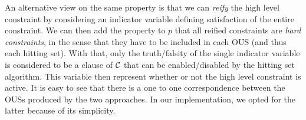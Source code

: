 {An alternative view on the same property is that we can \emph{reify} the high level constraint by considering an indicator variable defining satisfaction of the entire constraint. 
We can then add the property to $p$ that all reified constraints are \emph{hard constraints}, in the sense that they have to be included in each OUS (and thus each hitting set). With that, only the truth/falsity of the single indicator variable is considered to be a clause of $\mathcal{C} $ that can be enabled/disabled by the hitting set algorithm. 
This variable then represent whether or not the high level constraint is active.
It is easy to see that there is a one to one correspondence between the OUSs produced by the two approaches. In our implementation, we opted for the latter because of its simplicity. 
}
